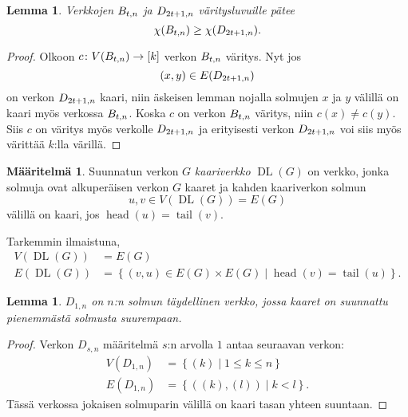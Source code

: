 \documentclass[finnish]{tktltiki2}
\newtheorem{lem}[lau]{Lemma}
\theoremstyle{definition}
\newtheorem{maar}[lau]{Määritelmä}
\theoremstyle{remark}
\newcommand{\set}[1]{\left\{ #1 \right\}}
\newcommand{\from}{\colon}
\DeclareMathOperator{\head}{head}
\DeclareMathOperator{\tail}{tail}
\DeclareMathOperator{\DL}{DL}
\newcommand{\Dsn}{D_{s,n}}
\begin{document}
\begin{lem}
    Verkkojen $B_{t,n}$ ja $D_{2t+1,n}$ väritysluvuille pätee
    \begin{equation*}
        \chi(B_{t,n}) \geq \chi(D_{2t+1,n}).
    \end{equation*}
\end{lem}

\begin{proof}
    Olkoon $c \from V(\Btn) \to [k]$ verkon $B_{t,n}$ väritys. Nyt jos
    \begin{equation*}
            (x,y) \in E(D_{2t+1,n})
    \end{equation*}
    on verkon $D_{2t+1,n}$ kaari, niin äskeisen lemman nojalla solmujen $x$ ja
    $y$ välillä on kaari myös verkossa $B_{t,n}$. Koska $c$ on verkon $B_{t,n}$
    väritys, niin $c(x) \neq c(y)$. Siis $c$ on väritys myös verkolle $D_{2t+1,n}$ ja
    erityisesti verkon $D_{2t+1,n}$ voi siis myös värittää $k$:lla värillä.
\end{proof}


\begin{maar}
    Suunnatun verkon $G$ \emph{kaariverkko} $\DL(G)$ on verkko, jonka solmuja ovat
    alkuperäisen verkon $G$ kaaret ja kahden kaariverkon solmun
    \begin{equation*}
        u,v \in V(\DL(G)) = E(G)
    \end{equation*}
    välillä on kaari, jos $\head(u) = \tail(v)$.
\end{maar}


Tarkemmin ilmaistuna,
%
\begin{align*}
    V(\DL(G)) &= E(G) \\
    E(\DL(G)) &= \set{(v,u) \in E(G) \times E(G) \mid \head(v) = \tail(u)}.
\end{align*}


\begin{lem}
    $D_{1,n}$ on $n$:n solmun täydellinen verkko, jossa kaaret on suunnattu
    pienemmästä solmusta suurempaan.
\end{lem}

\begin{proof}
    Verkon $\Dsn$ määritelmä $s$:n arvolla $1$ antaa seuraavan verkon:
    \begin{align*}
        V(D_{1,n}) &= \set{(k) \mid 1 \leq k \leq n} \\
        E(D_{1,n}) &= \set{((k), (l)) \mid k < l}.
    \end{align*}
    Tässä verkossa jokaisen solmuparin välillä on kaari tasan yhteen
    suuntaan.
\end{proof}
\end{document}
